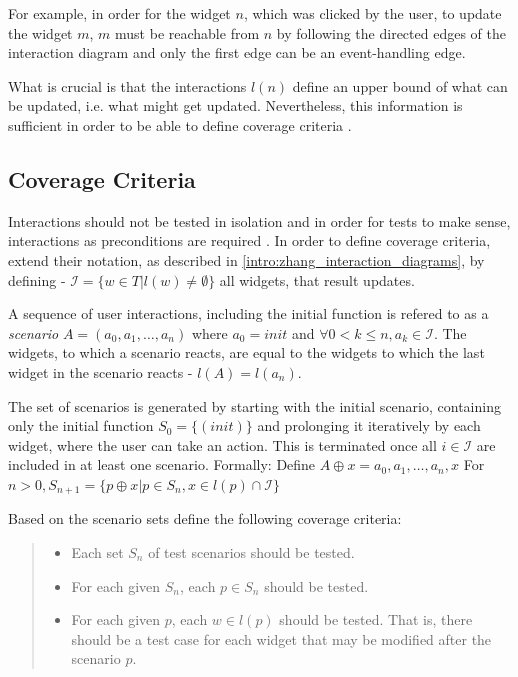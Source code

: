 For example, in order for the widget $n$, which was clicked by the user, to update the widget $m$, $m$ must be reachable from $n$ by following the directed edges of the interaction diagram and only the first edge can be an event-handling edge.

What is crucial is that the interactions $l(n)$ define an upper bound of what can be updated, i.e. what might get updated. Nevertheless, this information is sufficient in order to be able to define coverage criteria \parencite{zhang2019scenario}.

\subsection{Coverage Criteria}
Interactions should not be tested in isolation and in order for tests to make sense, interactions as preconditions are required \parencite{zhang2019scenario}. 
In order to define coverage criteria, \textcite{zhang2019scenario} extend their notation, as described in \ref{intro:zhang_interaction_diagrams}, by defining - $\mathcal{I}  = \{w\in T | l(w) \neq \emptyset \}$ all widgets, that result updates.

A sequence of user interactions, including the initial function is refered to as a \textit{scenario} $A=(a_0,a_1,\ldots, a_n)$ where $a_0=init$ and $\forall0 < k \leq n, a_k \in \mathcal{I}$. The widgets, to which a scenario reacts, are equal to the widgets to which the last widget in the scenario reacts - $l(A)=l(a_n)$. 


The set of scenarios is generated by starting with the initial scenario, containing only the initial function $S_0 = \{(init)\}$ and prolonging it iteratively by each widget, where the user can take an action. This is terminated once all $i \in \mathcal{I}$ are included in at least one scenario. Formally:
Define $A \oplus x = a_0,a_1,\ldots,a_n,x$ For $n > 0, S_{n+1}= \{ p \oplus x |p \in S_n, x \in l(p) \cap \mathcal{I}\}$ 

Based on the scenario sets \textcite{zhang2019scenario} define the following coverage criteria:
\begin{quote}
\begin{itemize}
  \item Each set $S_n$ of test scenarios should be tested.
  \item For each given $S_n$, each $p \in S_n$ should be tested.
  \item For each given $p$, each $w \in l(p)$ should be tested. That is, there should be a
  test case for each widget that may be modified after the scenario $p$.
\end{itemize} 
\end{quote}

